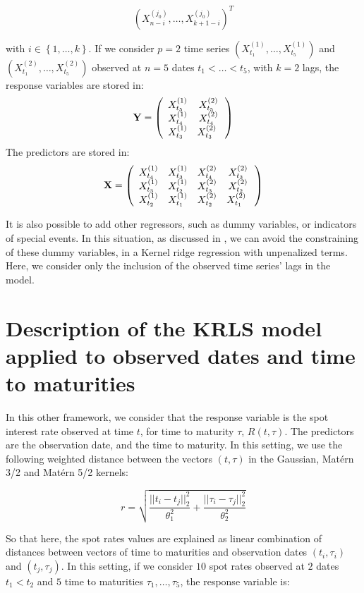\begin{equation}
\left( X^{(j_0)}_{n-i}, \ldots, X^{(j_0)}_{k+1-i} \right)^T
\end{equation}

with $i \in
\left\lbrace 1, \ldots, k \right\rbrace$. If we consider $p = 2$ time series $(X^{(1)}_{t_1}, \ldots,  X^{(1)}_{t_5})$ and $(X^{(2)}_{t_1}, \ldots,  X^{(2)}_{t_5})$ observed at $n = 5$ dates $t_1 < \ldots < t_5$, with $k = 2$ lags,  the response variables are stored in:
$$
{\bf Y} = \left( {\begin{array}{cc} X^{(1)}_{t_5} &  X^{(2)}_{t_5}\\ X^{(1)}_{t_4} & X^{(2)}_{t_4} \\ X^{(1)}_{t_3} & X^{(2)}_{t_3}\      \end{array} } \right)
$$
The predictors are stored in:
$$
{\bf X} = \left( {\begin{array}{cccc} X^{(1)}_{t_4} & X^{(1)}_{t_3} & X^{(2)}_{t_4} & X^{(2)}_{t_3} \\ X^{(1)}_{t_3} & X^{(1)}_{t_2} & X^{(2)}_{t_3} & X^{(2)}_{t_2} \\ X^{(1)}_{t_2} & X^{(1)}_{t_1} & X^{(2)}_{t_2} & X^{(2)}_{t_1} \      \end{array} }\right)
$$


It is also possible to add other regressors, such as dummy variables, or indicators of special events. In this situation, as discussed in \cite{exterkate2016nonlinear}, we can avoid the constraining of these dummy variables, in a Kernel ridge regression with unpenalized terms. Here, we consider only the inclusion of the observed time series' lags in the model.

\section{Description of the KRLS model applied to observed dates and time to maturities}
\label{sec:purekrls}

In this other framework, we consider that the response variable is the spot interest rate observed at time $t$, for time to maturity $\tau$, $R(t, \tau)$. The predictors are the observation date, and the time to maturity. In this setting, we use the following weighted distance between the vectors $(t, \tau)$ in the Gaussian, Mat\'ern 3/2 and Mat\'ern 5/2 kernels:

$$
r = \sqrt{\frac{||t_i - t_j||^2_2}{\theta_1^2} + \frac{||\tau_i - \tau_j||^2_2}{\theta_2^2}}
$$

So that here, the spot rates values are explained as linear combination of distances between vectors of  time to maturities and observation dates $(t_i, \tau_i)$ and $(t_j, \tau_j)$. In this setting, if we consider $10$ spot rates observed at $2$ dates $t_1 < t_2$ and $5$ time to maturities $\tau_1, \ldots, \tau_5$, the response variable is:

